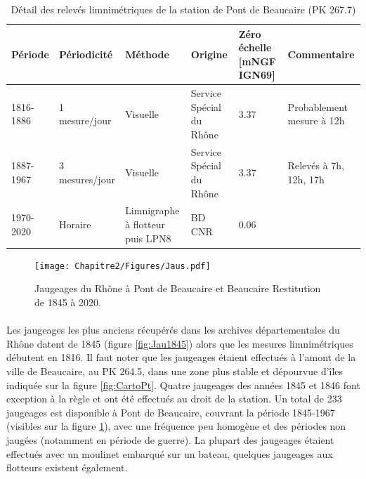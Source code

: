     
	\begin{table}[h]
	\centering
	\caption{Détail des relevés limnimétriques de la station de Pont de Beaucaire (PK 267.7)}
    \label{tab:MesuresPtBcr}
       \begin{tabular}{| m{2cm} | m{2.6cm}| m{2.2cm} | m{3cm} | m{2.7cm} | m{2.5cm} |} 
                \hline
               Période & Périodicité & Méthode & Origine & Zéro échelle [mNGF IGN69] & Commentaire \\
                \hline
                1816-1886 & 1 mesure/jour & Visuelle & 
                Service Spécial du Rhône & 3.37 & Probablement mesure à 12h \\
                \hline
                1887-1967 & 3 mesures/jour & Visuelle & 
                Service Spécial du Rhône & 3.37 & Relevés à 7h, 12h, 17h\\
                \hline
               1970-2020 & Horaire & Limnigraphe à flotteur puis LPN8 & 
                BD CNR & 0.06 &  \\
                \hline
		\end{tabular}
       \end{table}       
       
        
    \begin{figure}[h]
	\centering
		\texttt{[image: Chapitre2/Figures/Jaus.pdf]}
        \caption{Jaugeages du Rhône à Pont de Beaucaire et Beaucaire Restitution de 1845 à 2020.}	
		\label{fig:JauAll}
	\end{figure}
       
    \paragraph{} Les jaugeages les plus anciens récupérés dans les archives départementales du Rhône datent de 1845 (figure \ref{fig:Jau1845}) alors que les mesures limnimétriques débutent en 1816. Il faut noter que les jaugeages étaient effectués à l'amont de la ville de Beaucaire, au PK 264.5, dans une zone plus stable et dépourvue d'îles indiquée sur la figure \ref{fig:CartoPt}. Quatre jaugeages des années 1845 et 1846 font exception à la règle et ont été effectués au droit de la station. Un total de 233 jaugeages est disponible à Pont de Beaucaire, couvrant la période 1845-1967 (visibles sur la figure \ref{fig:JauAll}), avec une fréquence peu homogène et des périodes non jaugées (notamment en période de guerre). La plupart des jaugeages étaient effectués avec un moulinet embarqué sur un bateau, quelques jaugeages aux flotteurs existent également. 
    
